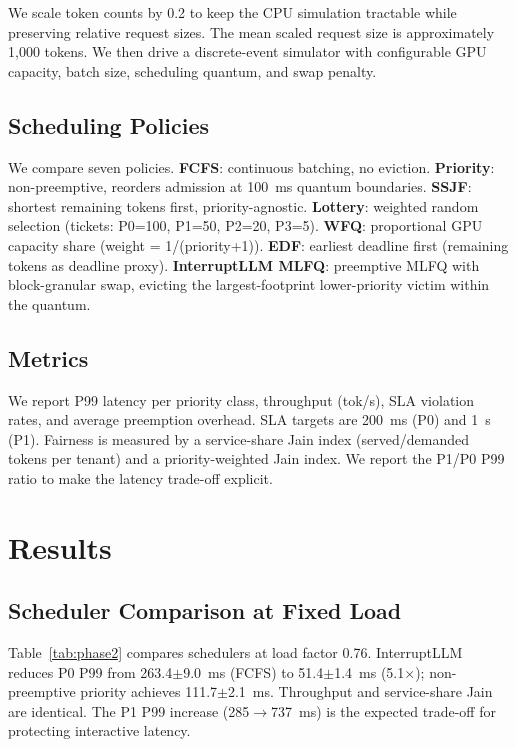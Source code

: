 \documentclass[conference]{IEEEtran}
\begin{document}
We scale token counts by 0.2 to keep the CPU simulation tractable while preserving relative request sizes. The mean scaled request size is approximately 1,000 tokens. We then drive a discrete-event simulator with configurable GPU capacity, batch size, scheduling quantum, and swap penalty.

\subsection{Scheduling Policies}

We compare seven policies. \textbf{FCFS}: continuous batching, no eviction. \textbf{Priority}: non-preemptive, reorders admission at 100~ms quantum boundaries. \textbf{SSJF}: shortest remaining tokens first, priority-agnostic. \textbf{Lottery}: weighted random selection (tickets: P0=100, P1=50, P2=20, P3=5). \textbf{WFQ}: proportional GPU capacity share (weight = 1/(priority+1)). \textbf{EDF}: earliest deadline first (remaining tokens as deadline proxy). \textbf{InterruptLLM MLFQ}: preemptive MLFQ with block-granular swap, evicting the largest-footprint lower-priority victim within the quantum.

\subsection{Metrics}

We report P99 latency per priority class, throughput (tok/s), SLA violation rates, and average preemption overhead. SLA targets are 200~ms (P0) and 1~s (P1). Fairness is measured by a service-share Jain index (served/demanded tokens per tenant) and a priority-weighted Jain index. We report the P1/P0 P99 ratio to make the latency trade-off explicit.

\section{Results}\label{sec:results}

\subsection{Scheduler Comparison at Fixed Load}

Table~\ref{tab:phase2} compares schedulers at load factor 0.76. InterruptLLM reduces P0 P99 from 263.4$\pm$9.0~ms (FCFS) to 51.4$\pm$1.4~ms (5.1$\times$); non-preemptive priority achieves 111.7$\pm$2.1~ms. Throughput and service-share Jain are identical. The P1 P99 increase (285$\to$737~ms) is the expected trade-off for protecting interactive latency.
\end{document}
